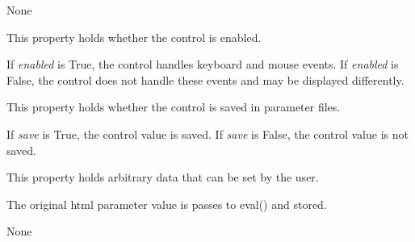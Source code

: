 \documentclass[letterpaper,10pt,english]{sphinxmanual}
\begin{document}
\begin{fulllineitems}
\begin{itemize}
\end{itemize}

\begin{fulllineitems}
\label{api:controls.NumBox.action}
None

\end{fulllineitems}


\begin{fulllineitems}
\label{api:controls.NumBox.enabled}
This property holds whether the control is enabled.

If \emph{enabled} is True, the control handles keyboard and mouse events.
If \emph{enabled} is False, the control does not handle these events and may
be displayed differently.

\end{fulllineitems}


\begin{fulllineitems}
\label{api:controls.NumBox.save}
This property holds whether the control is saved in parameter files.

If \emph{save} is True, the control value is saved.
If \emph{save} is False, the control value is not saved.

\end{fulllineitems}


\begin{fulllineitems}
\label{api:controls.NumBox.user}
This property holds arbitrary data that can be set by the user.

The original html parameter value is passes to eval() and stored.

\end{fulllineitems}


\begin{fulllineitems}
\label{api:controls.NumBox.value}
None

\end{fulllineitems}


\end{fulllineitems}
\end{document}
